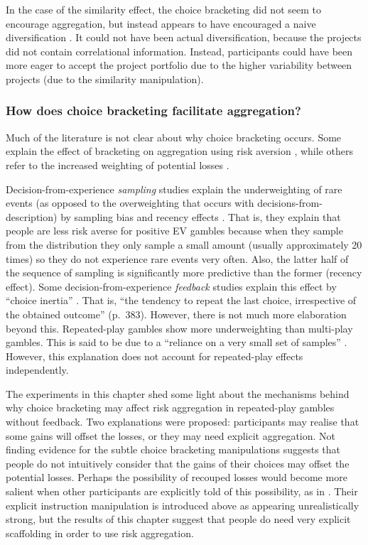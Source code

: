 \documentclass[a4paper, nobind, dvipsnames]{templates/ociamthesis}
\theoremstyle{definition}
\theoremstyle{definition}
\theoremstyle{definition}
\theoremstyle{definition}
\theoremstyle{remark}
\begin{document}
In the case of the similarity effect, the choice bracketing did not seem to
encourage aggregation, but instead appears to have encouraged a naive
diversification \autocite{hedesstrom2006,read1995}. It could not have been actual
diversification, because the projects did not contain correlational information.
Instead, participants could have been more eager to accept the project portfolio
due to the higher variability between projects (due to the similarity
manipulation).

\subsubsection{How does choice bracketing facilitate aggregation?}

Much of the literature \autocite[e.g.,][]{benartzi1999} is not clear about why choice
bracketing occurs. Some explain the effect of bracketing on aggregation using
risk aversion \autocite[e.g.,][]{read1999}, while others refer to the increased weighting
of potential losses \autocite{webb2017}.

Decision-from-experience \emph{sampling} studies explain the underweighting of rare
events (as opposed to the overweighting that occurs with
decisions-from-description) by sampling bias and recency effects \autocites[e.g.,][]{hertwig2004,wulff2018}. That is, they explain that people are less risk
averse for positive EV gambles because when they sample from the distribution
they only sample a small amount (usually approximately 20 times) so they do not
experience rare events very often. Also, the latter half of the sequence of
sampling is significantly more predictive than the former (recency effect). Some
decision-from-experience \emph{feedback} studies explain this effect by ``choice
inertia'' \autocite{camilleri2011}. That is, ``the tendency to repeat the last choice,
irrespective of the obtained outcome'' (p.~383). However, there is not much more
elaboration beyond this. Repeated-play gambles show more underweighting than
multi-play gambles. This is said to be due to a ``reliance on a very small set of
samples'' \autocite[p.~64]{camilleri2013}. However, this explanation does not account for
repeated-play effects independently.

The experiments in this chapter shed some light about the mechanisms behind why
choice bracketing may affect risk aggregation in repeated-play gambles without
feedback. Two explanations were proposed: participants may realise that some
gains will offset the losses, or they may need explicit aggregation. Not finding
evidence for the subtle choice bracketing manipulations suggests that people do
not intuitively consider that the gains of their choices may offset the
potential losses. Perhaps the possibility of recouped losses would become more
salient when other participants are explicitly told of this possibility, as in
\textcite{sokolhessner2009}. Their explicit instruction manipulation is introduced above
as appearing unrealistically strong, but the results of this chapter suggest
that people do need very explicit scaffolding in order to use risk aggregation.
\end{document}
